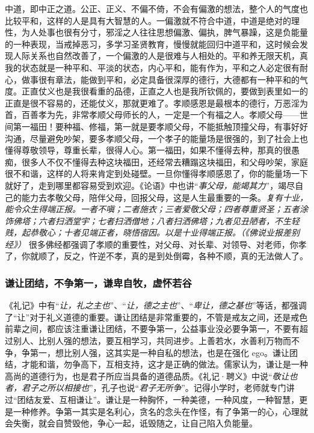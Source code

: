 中道，即中正之道。公正、正义、不偏不倚，不会有偏激的想法，整个人的气度也比较平和，这样的人是具有大智慧的人。一偏激就不符合中道，中道是绝对的理性，为人处事也很有分寸，邪淫之人往往思想偏激、偏执，脾气暴躁，这是负能量的一种表现，当戒掉恶习，多学习圣贤教育，慢慢就能回归中道平和，这时候会发现人际关系也自然改善了，一个偏激的人是很难与人相处的。平和养无限天机，真我的状态就是一种平和、平淡的状态，内心平和，能有作为，平和之人必定很有耐心，做事很有章法，能做到平和，必定具备很深厚的德行，大德都有一种平和的气度。正直仗义也是我很看重的品德，正直之人也是我所钦佩的，要做到表里如一的正直是很不容易的，还能仗义，那就更难了。孝顺感恩是最根本的德行，万恶淫为首，百善孝为先，非常孝顺父母师长的人，一定是一个有福之人。孝顺父母——世间第一福田！要种福、修福，第一就是要孝顺父母，不能抵触顶撞父母，有事好好沟通，尽量避免吵架，要多孝顺父母，一个孝子的能量场是很强的，到了社会上也懂得尊敬领导，尊重长辈，很得人心。第一福田，如果不懂得去种，那真的很愚痴，很多人不仅不懂得去种这块福田，还经常去糟蹋这块福田，和父母吵架，家庭很不和谐，这样的人将来肯定到处碰壁。一旦你懂得孝顺感恩了，你的能量场一下就好了，走到哪里都容易受到欢迎。《论语》中也讲“\textit{事父母，能竭其力}”，竭尽自己的能力去孝敬父母，陪伴父母，回报父母，这是人生最重要的一条。\textit{复有十业，能令众生得端正报。一者不嗔；二者施衣；三者爱敬父母；四者尊重贤圣；五者涂饰佛塔；六者扫洒堂宇；七者扫洒僧地；八者扫洒佛塔；九者见丑陋者，不生轻贱，起恭敬心；十者见端正者，晓悟宿因。以是十业得端正报。（《佛说业报差别经》）} 很多佛经都强调了孝顺的重要性，对父母、对长辈、对领导、对老师，你孝了，你就顺了，反之，忤逆不孝，真的是到处倒霉，各种不顺，真的无法做人了。

\subsubsection{谦让团结，不争第一，谦卑自牧，虚怀若谷}

《礼记》中有“\textit{让，礼之主也}”、“\textit{让，德之主也}”、“\textit{卑让，德之基也}”等话，都强调了“让”对于礼义道德的重要。谦让团结是非常重要的，不管是戒友之间，还是戒色前辈之间，都应该注重谦让团结，不要争第一，公益事业没必要争第一，不要有超过别人、比别人强的想法，要互相学习，共同进步。上善若水，水善利万物而不争，争第一，想比别人强，这其实是一种自私的想法，也是在强化 ego。谦让团结，才能和谐，勿争高下，互相支持，这才是正确的做法。儒家认为，谦让是一种高尚的道德行为，也是君子所应当具备的道德品质。《礼记·聘义》中说“\textit{敬让也者，君子之所以相接也}”，孔子也说“\textit{君子无所争}”。记得小学时，老师就专门讲过“团结友爱、互相谦让”。谦让是一种胸怀，一种美德，一种风度，一种智慧，更是一种修养。争第一其实是名利心，贪名的念头在作怪，有了争第一的心，心理就会失衡，就会自赞毁他，争心一起，诋毁随之，让自己陷入负能量。

